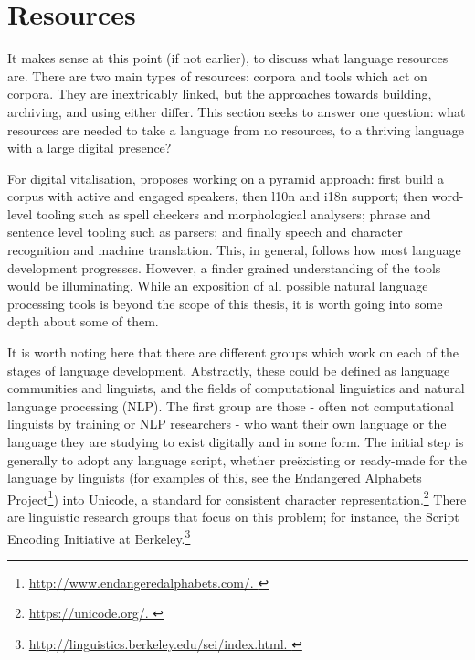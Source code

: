 \section{Resources}
\label{sec:resources}

It makes sense at this point (if not earlier), to discuss what language resources are. There are two main types of resources: corpora and tools which act on corpora. They are inextricably linked, but the approaches towards building, archiving, and using either differ. This section seeks to answer one question: what resources are needed to take a language from no resources, to a thriving language with a large digital presence?

For digital vitalisation, \citet{kornai2015new} proposes working on a pyramid approach: first build a corpus with active and engaged speakers, then l10n and i18n support; then word-level tooling such as spell checkers and morphological analysers; phrase and sentence level tooling such as parsers; and finally speech and character recognition and machine translation. This, in general, follows how most language development progresses. However, a finder grained understanding of the tools would be illuminating. While an exposition of all possible natural language processing tools is beyond the scope of this thesis, it is worth going into some depth about some of them.

It is worth noting here that there are different groups which work on each of the stages of language development. Abstractly, these could be defined as language communities and linguists, and the fields of computational linguistics and natural language processing (NLP). The first group are those - often not computational linguists by training or NLP researchers - who want their own language or the language they are studying to exist digitally and in some form. The initial step is generally to adopt any language script, whether  pre\"{e}xisting or ready-made for the language by linguists (for examples of this, see the Endangered Alphabets Project\footnote{\href{http://www.endangeredalphabets.com/}{http://www.endangeredalphabets.com/. }}) into Unicode, a standard for consistent character representation.\footnote{\href{https://unicode.org/}{https://unicode.org/. }} There are linguistic research groups that focus on this problem; for instance, the Script Encoding Initiative at Berkeley.\footnote{\href{http://linguistics.berkeley.edu/sei/index.html}{http://linguistics.berkeley.edu/sei/index.html. }}

